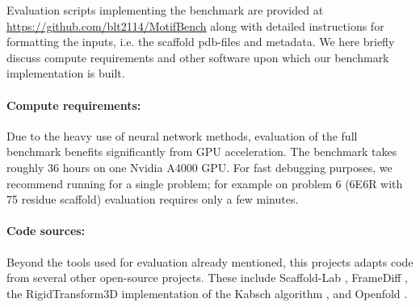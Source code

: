 Evaluation scripts implementing the benchmark are provided at \url{https://github.com/blt2114/MotifBench} along with detailed instructions for formatting the inputs, i.e. the scaffold pdb-files and metadata.
We here briefly discuss compute requirements and other software upon which our benchmark implementation is built.

\paragraph{Compute requirements:}
Due to the heavy use of neural network methods,
evaluation of the full benchmark benefits significantly from GPU acceleration.
The benchmark takes roughly 36 hours on one Nvidia A4000 GPU.
For fast debugging purposes, we recommend running for a single problem;
for example on problem 6 (6E6R with 75 residue scaffold) evaluation requires only a few minutes.

\paragraph{Code sources:}
Beyond the tools used for evaluation already mentioned, this projects adapts code from several other open-source projects.  These include Scaffold-Lab \citep{zheng2024scaffold}, FrameDiff \citep{yim2023se},
the RigidTransform3D \citep{nghiaho12_rigid_transform_3D} implementation of the Kabsch algorithm \citep{kabsch1976solution,arun1987least}, and Openfold \citep{ahdritz2024openfold}.